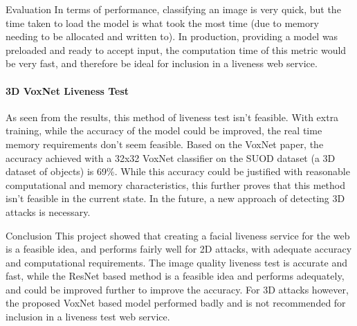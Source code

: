 \documentclass[final]{beamer}
\begin{document}
\begin{frame}{}
\begin{columns}[t]
\begin{column}{.48\linewidth}
\begin{block}{Evaluation}
          In terms of performance, classifying an image is very quick, but the time taken to load the model is what took the most time (due to memory needing to be allocated and written to).
          In production, providing a model was preloaded and ready to accept input, the computation time of this metric would be very fast, and therefore be ideal for inclusion in a liveness web service.
      \paragraph{3D VoxNet Liveness Test}
          As seen from the results, this method of liveness test isn't feasible. With extra training, while the accuracy of the model could be improved, the
          real time memory requirements don't seem feasible. Based on the VoxNet paper, the accuracy achieved with a 32x32 VoxNet classifier on the SUOD dataset (a 3D dataset of objects)
          is 69\%. While this accuracy could be justified with reasonable computational and memory characteristics, this further proves that this method isn't feasible in the current state. In the future, a new approach of detecting 3D attacks is necessary.

        \end{block}
        
        \begin{block}{Conclusion}
          This project showed that creating a facial liveness service for the web is a feasible idea, and performs fairly well for 2D attacks, with adequate accuracy and computational requirements.
          The image quality liveness test is accurate and fast, while the ResNet based method is a feasible idea and performs adequately, and could be improved further to improve the accuracy. For 3D attacks however, the
          proposed VoxNet based model performed badly and is not recommended for inclusion in a liveness test web service.

        \end{block}
      \end{column}
    \end{columns}


  \end{frame}
\end{document}

